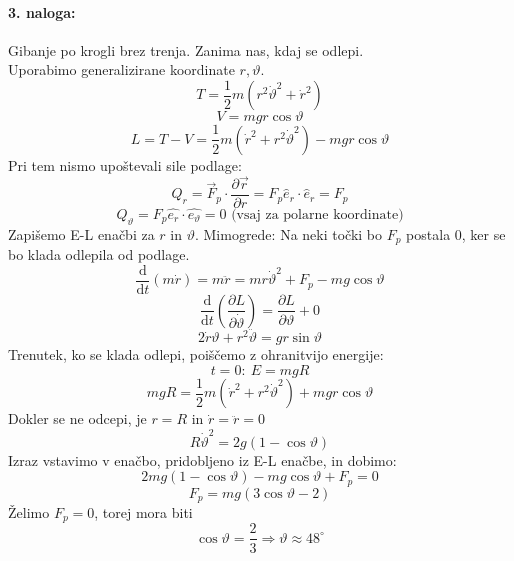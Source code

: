 \documentclass[a4paper]{article}
\newcommand{\vct}[1]{\overrightarrow{#1}}
\newcommand{\pd}[2]{\frac{\partial {#1}}{\partial {#2}}}
\newcommand{\dd}[2]{\frac{\mathrm{d} {#1}}{\mathrm{d} {#2}}}
\begin{document}
\paragraph{3. naloga:} Gibanje po krogli brez trenja. Zanima nas, kdaj se odlepi. \\
Uporabimo generalizirane koordinate $r, \vartheta$.
$$T = \frac{1}{2}m\left(r^2\dot{\vartheta}^2 + \dot{r}^2\right)$$
$$V = mgr\cos\vartheta$$
$$L = T - V = \frac{1}{2}m(\dot{r}^2 + r^2\dot{\vartheta}^2) - mgr\cos\vartheta$$
Pri tem nismo upoštevali sile podlage:
$$Q_r = \vct{F}_p\cdot\pd{\vct{r}}{r} = F_p\hat{e}_r\cdot\hat{e}_r = F_p$$
$$Q_\vartheta = F_p \hat{e_r}\cdot\hat{e_\vartheta} = 0 \text{ (vsaj za polarne koordinate)}$$
Zapišemo E-L enačbi za $r$ in $\vartheta$. Mimogrede: Na neki točki bo $F_p$ postala 0, ker se bo klada odlepila od podlage.
$$\dd{}{t} \left(m\dot{r}\right) = m\ddot{r} = mr\dot{\vartheta}^2 + F_p - mg\cos\vartheta$$
$$\dd{}{t}\left(\pd{L}{\dot{\vartheta}}\right) = \pd{L}{\vartheta} + 0$$
$$2\dot{r}\vartheta + r^2\ddot{\vartheta} = gr\sin\vartheta$$
Trenutek, ko se klada odlepi, poiščemo z ohranitvijo energije:
$$t=0:~E = mgR$$
$$mgR = \frac{1}{2}m(\dot{r}^2 + r^2\dot{\vartheta}^2) + mgr\cos\vartheta$$
Dokler se ne odcepi, je $r = R$ in $\dot{r} = \ddot{r} = 0$
$$R\dot{\vartheta}^2 = 2g(1-\cos\vartheta)$$
Izraz vstavimo v enačbo, pridobljeno iz E-L enačbe, in dobimo:
$$2mg(1-\cos\vartheta) - mg\cos\vartheta + F_p = 0$$
$$F_p = mg(3\cos\vartheta - 2)$$
Želimo $F_p = 0$, torej mora biti $$\cos\vartheta = \frac{2}{3} \Rightarrow \vartheta \approx 48^\circ$$
\end{document}
